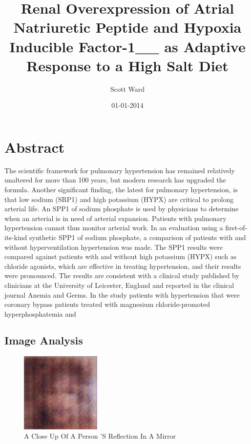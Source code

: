 \documentclass{article}%
\title{Renal Overexpression of Atrial Natriuretic Peptide and Hypoxia Inducible Factor{-}1\_\_ as Adaptive Response to a High Salt Diet}%
\author{Scott Ward}%
\affil{Department of Nephrology, University of California, San Francisco, San Francisco, California, United States of America}%
\date{01{-}01{-}2014}%
\begin{document}
%
\normalsize%
\maketitle%
\section{Abstract}%
\label{sec:Abstract}%
The scientific framework for pulmonary hypertension has remained relatively unaltered for more than 100 years, but modern research has upgraded the formula.\newline%
Another significant finding, the latest for pulmonary hypertension, is that low sodium (SRP1) and high potassium (HYPX) are critical to prolong arterial life.\newline%
An SPP1 of sodium phosphate is used by physicians to determine when an arterial is in need of arterial expansion. Patients with pulmonary hypertension cannot thus monitor arterial work.\newline%
In an evaluation using a first{-}of{-}its{-}kind synthetic SPP1 of sodium phosphate, a comparison of patients with and without hyperventilation hypertension was made. The SPP1 results were compared against patients with and without high potassium (HYPX) such as chloride agonists, which are effective in treating hypertension, and their results were pronounced.\newline%
The results are consistent with a clinical study published by clinicians at the University of Leicester, England and reported in the clinical journal Anemia and Germs. In the study patients with hypertension that were coronary bypass patients treated with magnesium chloride{-}promoted hyperphosphatemia and

%
\subsection{Image Analysis}%
\label{subsec:ImageAnalysis}%


\begin{figure}[h!]%
\centering%
\includegraphics[width=150px]{500_fake_images/samples_5_187.png}%
\caption{A Close Up Of A Person 'S Reflection In A Mirror}%
\end{figure}

%
\end{document}
